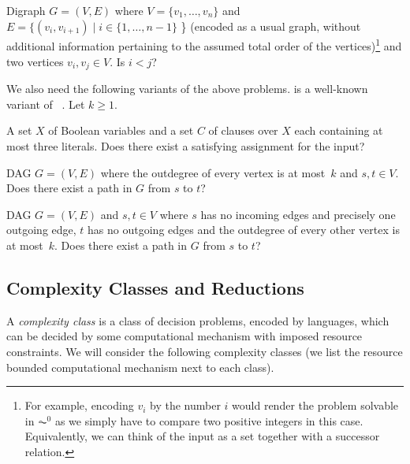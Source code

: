 \IN{\ORD}
{Digraph $G = (V, E)$ where $V = \{v_1, \ldots, v_n\}$ and $E = \{ (v_i, v_{i+1}) \mid i \in \{1,\ldots,n-1\}$ \} (encoded as a usual graph, without
		additional information pertaining to the assumed total order of the vertices)\footnote{For example, encoding $v_i$ by the number $i$ would render the problem solvable in $\AC^0$
			as we simply have to compare two positive integers in this case. Equivalently, we can think of the input
			as a set together with a successor relation.} and two vertices $v_i, v_j \in V$.}
{Is $i < j$?}

We also need the following variants of the above problems. 
\THREESAT is a well-known variant of \SAT~\cite{garey1979computers,Karp1972}.  Let $k \ge 1$.

\IN{\THREESAT}
{A set $X$ of Boolean variables and a set $C$ of clauses over $X$ each containing at most three literals.}
{Does there exist a satisfying assignment for the input?}

\IN{\KDAG} 
\decisionproblem{\KDAG}
{DAG $G = (V, E)$ where the outdegree of every vertex is at most~$k$ and $s,t \in V$.}
{Does there exist a path in $G$ from $s$ to $t$?}


\IN{\KDAGST}
\decisionproblem{\KDAGST}
{DAG $G = (V, E)$ and $s, t \in V$ where $s$ has no incoming edges and precisely one outgoing edge, $t$ has no outgoing edges and the outdegree of every other vertex is at most~$k$.}
{Does there exist a path in $G$ from $s$ to $t$?}

\subsection{Complexity Classes and Reductions}
\label{prelim:sec:compl_classes}

A \emph{complexity class} is a class of decision problems, encoded by languages,
which can be decided by some computational mechanism with imposed
resource constraints.
We will consider the following complexity classes (we list the resource bounded computational mechanism next to each class).

